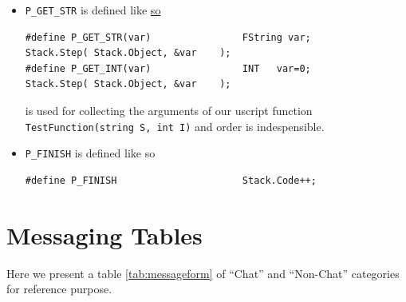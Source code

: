 \documentclass{article}
\theoremstyle{definition}
\begin{document}
\begin{itemize}
\item \texttt{P\_GET\_STR} is defined like \href{https://github.com/ravimohan1991/ChatDiamond/blob/5592fef2b13305e441c1dd2b09dde7dd52ff2d83/UTNativeEssentials/Core/Inc/UnScript.h#L63}{so}
\lstset{language=C++}
\begin{lstlisting}[frame=single]
#define P_GET_STR(var)                FString var;                         Stack.Step( Stack.Object, &var    );
#define P_GET_INT(var)                INT   var=0;                         Stack.Step( Stack.Object, &var    );
\end{lstlisting}
is used for collecting the arguments of our uscript function \texttt{TestFunction(string S, int I)} and order is indespensible.
\item \texttt{P\_FINISH} is defined like so

\lstset{language=C++}
\begin{lstlisting}[frame=single]
#define P_FINISH                      Stack.Code++;
\end{lstlisting}

\end{itemize}

\appendix

\section{Messaging Tables}
\label{append:messagingtables}

Here we present a table \ref{tab:messageform}  of ``Chat'' and ``Non-Chat'' categories for reference purpose.
\end{document}
